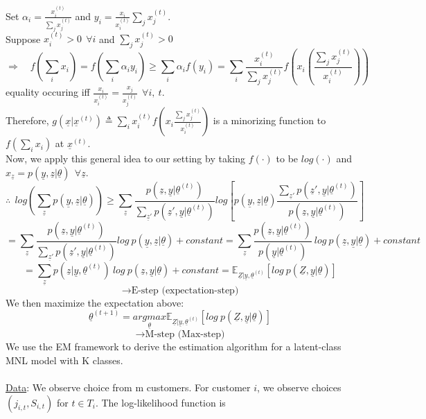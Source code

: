 \documentclass[11pt]{article}
\begin{document}
Set $\alpha_i = \frac{x_i^{(t)}}{\sum_j x_j^{(t)}}$ and $y_i = \frac{x_i}{x_i^{(t)}}\sum_j x_j^{(t)}$.\\
Suppose $x_i^{(t)}>0\ \ \forall i$ and $\sum_j x_j^{(t)}>0$
$$\Longrightarrow \quad f(\sum_i x_i) = f(\sum_i \alpha_i y_i) \geq \sum_i \alpha_i f(y_i) = \sum_i \frac{x_i^{(t)}}{\sum_j x_j^{(t)}}f(x_i(\frac{\sum_j x_j^{(t)}}{x_i^{(t)}}))$$
equality occuring iff $\frac{x_i}{x_i^{(t)}} = \frac{x_j}{x_j^{(t)}}\ \ \forall i,\ t$.\\
Therefore, $g(\underline{x}|\underline{x}^{(t)})\triangleq \sum_i x_i^{(t)}f(x_i \frac{\sum_j x_j^{(t)}}{x_i^{(t)}})$ is a minorizing function to $f(\sum_i x_i)$ at $\underline{x}^{(t)}$.\\
Now, we apply this general idea to our setting by taking $f(\cdot)$ to be $log(\cdot)$ and $x_{\underline{z}}=
p(\underline{y},\underline{z}|\underline{\theta})\ \ \forall \underline{z}$.
$$\therefore\ \  log(\sum_{\underline{z}}p(\underline{y},\underline{z}|\underline{\theta}))\geq \sum_{\underline{z}}\frac{p(\underline{z},\underline{y}|\underline{\theta}^{(t)})}{\sum_{\underline{z}'}p(\underline{z}',\underline{y}|\underline{\theta}^{(t)})}log[p(\underline{y},\underline{z}|\underline{\theta})\frac{\sum_{\underline{z}'}p(\underline{z}',\underline{y}|\underline{\theta}^{(t)})}{p(\underline{z},\underline{y}|\underline{\theta}^{(t)})}]$$
$$=\sum_{\underline{z}}\frac{p(\underline{z},\underline{y}|\underline{\theta}^{(t)})}{\sum_{\underline{z}'}p(\underline{z}',\underline{y}|\underline{\theta}^{(t)})}log\ p(\underline{y},\underline{z}|\underline{\theta})+constant=\sum_{\underline{z}}\frac{p(\underline{z},\underline{y}|\underline{\theta}^{(t)})}{p(\underline{y}|\underline{\theta}^{(t)})}\ log\ p(\underline{z},\underline{y}|\underline{\theta})+constant$$
$$=\sum_{\underline{z}}p(\underline{z}|\underline{y},\underline{\theta}^{(t)})\ log\ p(\underline{z},\underline{y}|\underline{\theta})+constant=\mathbb{E}_{\underline{Z}|\underline{y},\underline{\theta}^{(t)}}[log\ p(\underline{Z},\underline{y}|\underline{\theta})]$$
$$\longrightarrow \textrm{E-step (expectation-step)}$$
We then maximize the expectation above:
$$\underline{\theta}^{(t+1)}=\underset{\underline{\theta}}{argmax}\mathbb{E}_{\underline{Z}|\underline{y},\underline{\theta}^{(t)}}[log\ p(\underline{Z},\underline{y}|\underline{\theta})]$$
$$\longrightarrow \textrm{M-step (Max-step)}$$
We use the EM framework to derive the estimation algorithm for a latent-class MNL model with K classes.\\~\\
\underline{Data}: We observe choice from m customers. For customer $i$, we observe choices $(j_{i,t},S_{i,t})$ for $t\in T_i$. The log-likelihood function is
\end{document}
